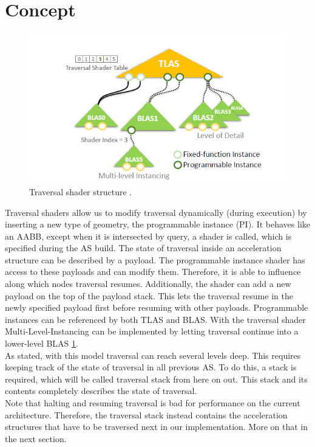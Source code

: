 \section{Concept}
\label{sec:Concept}
\begin{figure}[h]
    \centering
    \includegraphics[width=.8\textwidth]{images/showcase/traversal hirarchy.PNG}
    \caption{Traversal shader structure \cite{traversalArticle}.}
    \label{fig:TraversalShader}
\end{figure}
Traversal shaders allow us to modify traversal dynamically (during execution) by inserting a new type of geometry, the programmable instance (PI). It behaves like an AABB, except when it is intersected by query, a shader is called, which is specified during the AS build. The state of traversal inside an acceleration structure can be described by a payload. The programmable instance shader has access to these payloads and can modify them. Therefore, it is able to influence along which nodes traversal resumes. Additionally, the shader can add a new payload on the top of the payload stack. This lets the traversal resume in the newly specified payload first before resuming with other payloads. Programmable instances can be referenced by both TLAS and BLAS. With the traversal shader Multi-Level-Instancing can be implemented by letting traversal continue into a lower-level BLAS \ref{fig:TraversalShader}.\\
As stated, with this model traversal can reach several levels deep. This requires keeping track of the state of traversal in all previous AS. To do this, a stack is required, which will be called traversal stack from here on out. This stack and its contents completely describes the state of traversal.\\
Note that halting and resuming traversal is bad for performance on the current architecture. Therefore, the traversal stack instead contains the acceleration structures that have to be traversed next in our implementation. More on that in the next section.\\
